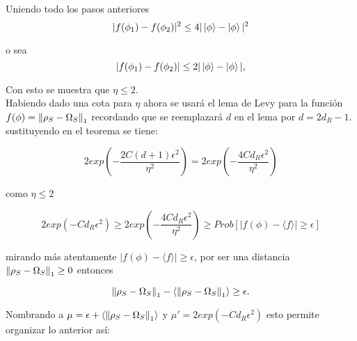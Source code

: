 Uniendo todo los pasos anteriores
\begin{equation}
|f(\phi_{1})-f(\phi_{2})|^{2} \le  4|\ket{\phi}-\ket{\phi}|^2
\end{equation}

o sea 
\begin{equation}
|f(\phi_{1})-f(\phi_{2})| \le  2|\ket{\phi}-\ket{\phi}|,
\end{equation}

Con esto se muestra que $\eta \le 2$.\\

Habiendo dado una cota para $\eta$ ahora se usará el lema de Levy para la función $f(\phi)=\norm{\rho_{S} -\Omega_{S}}_{1}$ recordando que se reemplazará $d$ en el lema por $d=2d_{R}-1$. sustituyendo en el teorema se tiene:

\begin{equation}
 2exp(-\frac{2C(d+1)\epsilon^2}{\eta^2})= 2exp(-\frac{4Cd_{R}\epsilon^2}{\eta^2})
\end{equation}

como $\eta \le 2$ 

\begin{equation}
2exp(-Cd_{R}\epsilon^2) \ge 2exp(-\frac{4Cd_{R}\epsilon^2}{\eta^2}) \ge Prob[|f(\phi)- \langle f \rangle| \ge \epsilon ]
\end{equation}

mirando más atentamente  $|f(\phi)- \langle f \rangle| \ge \epsilon $, por ser  una distancia $\norm{\rho_{S} -\Omega_{S}}_{1} \ge 0$ entonces


\begin{equation}
\norm{\rho_{S} -\Omega_{S}}_{1}- \langle \norm{\rho_{S} -\Omega_{S}}_{1} \rangle \ge \epsilon.
\end{equation}

Nombrando a $\mu = \epsilon + \langle \norm{\rho_{S} -\Omega_{S}}_{1} \rangle $ y $\mu'=2 exp(-Cd_{R}\epsilon^2)$ esto permite organizar lo anterior así:

